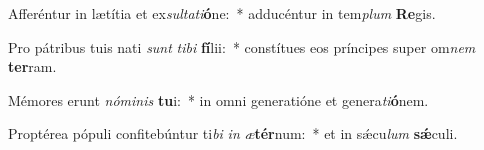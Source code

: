 \item Afferéntur in lætítia et ex\textit{sul}\textit{ta}\textit{ti}\textbf{ó}ne:~* adducéntur in tem\textit{plum} \textbf{Re}gis.
\item Pro pátribus tuis nati \textit{sunt} \textit{ti}\textit{bi} \textbf{fí}lii:~* constítues eos príncipes super om\textit{nem} \textbf{ter}ram.
\item Mémores erunt \textit{nó}\textit{mi}\textit{nis} \textbf{tu}i:~* in omni generatióne et genera\textit{ti}\textbf{ó}nem.
\item Proptérea pópuli confitebúntur ti\textit{bi} \textit{in} \textit{æ}\textbf{tér}num:~* et in sǽcu\textit{lum} \textbf{sǽ}culi.
